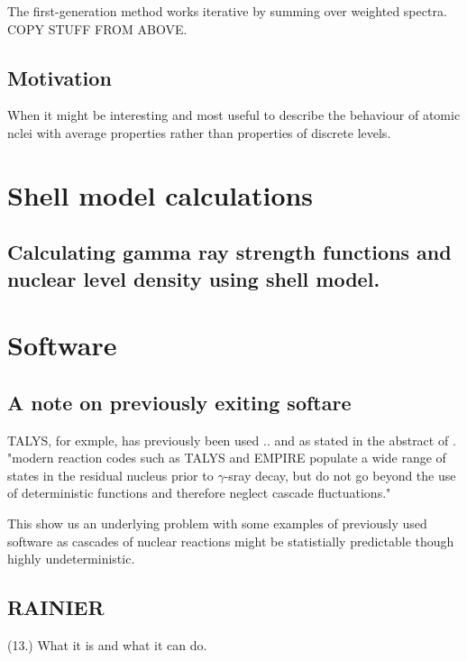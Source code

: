\documentclass[%
 reprint,
 amsmath,amssymb,
 aps,
 norsk
]{revtex4-1}
\begin{document}
The first-generation method works iterative by summing over weighted spectra\cite{guttormsen_firstgenerationgamma}. COPY STUFF FROM ABOVE.

\subsection{Motivation}
When it might be interesting and most useful to describe the behaviour of atomic nclei with average properties rather than properties of discrete levels.


\section{Shell model calculations}







\subsection{Calculating gamma ray strength functions and nuclear level density using shell model.}





\section{Software}

\subsection{A note on previously exiting softare}
TALYS, for exmple, has previously been used 
.. and as stated in the abstract of \cite{Kirsch_RAINIER}.
"modern reaction codes such as TALYS and EMPIRE populate a wide range of states in the residual nucleus prior to $\gamma$-sray decay, but do not go beyond the use of deterministic functions and therefore neglect cascade fluctuations."

This show us an underlying problem with some examples of previously used software as cascades of nuclear reactions might be statistially predictable though highly undeterministic. 


\subsection{RAINIER}

(13.) What it is and what it can do.
\end{document}
